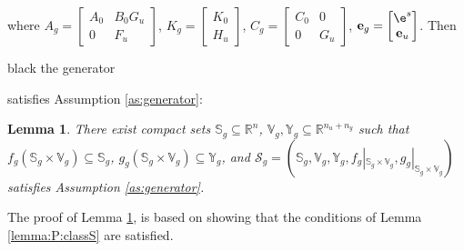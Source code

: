 \documentclass{ifacconf}
\def\rve{{\mathbf{e}}}
\def\rvw{{\mathbf{w}}}
\def\vs{{\bm{s}}}
\def\vv{{\bm{v}}}
\def\vw{{\bm{w}}}
\newtheorem{lemma}{Lemma}[section]
\newcommand{\class}{\(\mathcal{SI}\)}
\begin{document}
	where $A_g=\begin{bmatrix} A_0 & B_0G_u \\0 & F_u \end{bmatrix}$, $K_g=\begin{bmatrix} K_0 \\ H_u \end{bmatrix}$,
  $C_g=\begin{bmatrix} C_0 & 0 \\ 0 & G_u \end{bmatrix}$, $\rve_g=\begin{bmatrix} \e^s \\ \rve_u \end{bmatrix}$.
  Then \begin{color}{black} the generator \end{color} satisfies Assumption \ref{as:generator}:
  \begin{lemma}
  \label{lemma:LTI:classS_g}
  There  exist compact sets
  $\mathbb{S}_g \subseteq \mathbb{R}^n$, $\mathbb{V}_g, \mathbb{Y}_g \subseteq \mathbb{R}^{n_u+n_y}$ such that 
  $f_g(\mathbb{S}_g \times \mathbb{V}_g) \subseteq \mathbb{S}_g$, $g_g(\mathbb{S}_g \times \mathbb{V}_g) \subseteq \mathbb{Y}_g$, and 
  $\mathcal{S}_g=(\mathbb{S}_g,\mathbb{V}_g,\mathbb{Y}_g,f_g|_{\mathbb{S}_g \times \mathbb{V}_g},g_g|_{\mathbb{S}_g \times \mathbb{V}_g})$ satisfies Assumption \ref{as:generator}.
  \end{lemma} 
  The proof of Lemma \ref{lemma:LTI:classS_g}, %
   is based on showing that the conditions of Lemma \ref{lemma:P:classS} are satisfied.

\end{document}
